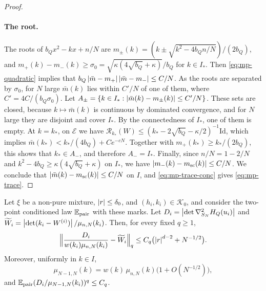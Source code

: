 \begin{proof}
\paragraph{The root.}
The roots of $b_Qx^2-kx+n/N$ are $m_\pm(k)=(k\pm\sqrt{k^2-4b_Qn/N})/(2b_Q)$, and $m_+(k)-m_-(k)\ge\sigma_0=\sqrt{\kappa(4\sqrt{b_Q}+\kappa)}/b_Q$ for $k\in I_*$. Then \eqref{eq:mp-quadratic} implies that $b_Q\left|\bar m-m_+\right|\left|\bar m-m_-\right|\le C/N$. As the roots are separated by $\sigma_0$, for $N$ large $\bar m(k)$ lies within $C'/N$ of one of them, where $C'=4C/(b_Q\sigma_0)$. Let $A_\pm=\{k\in I_*:\left|\bar m(k)-m_\pm(k)\right|\le C'/N\}$. These sets are closed, because $k\mapsto\bar m(k)$ is continuous by dominated convergence, and for $N$ large they are disjoint and cover $I_*$. By the connectedness of $I_*$, one of them is empty. At $k=k_*$, on $\mathcal E$ we have $\mathcal R_{k_*}(W)\le(k_*-2\sqrt{b_Q}-\kappa/2)^{-1}\mathrm{Id}$, which implies $\bar m(k_*)<k_*/(4b_Q)+Ce^{-cN}$. Together with $m_+(k_*)\ge k_*/(2b_Q)$, this shows that $k_*\in A_-$, and therefore $A_-=I_*$. Finally, since $n/N=1-2/N$ and $k^2-4b_Q\ge\kappa(4\sqrt{b_Q}+\kappa)$ on $I_*$, we have $\left|m_-(k)-m_{\rm sc}(k)\right|\le C/N$. We conclude that $\left|\bar m(k)-m_{\rm sc}(k)\right|\le C/N$ on $I$, and \eqref{eq:mp-trace-conc} gives \eqref{eq:mp-trace}.
\end{proof}

\begin{lemma}\label{lem:mp-schur}
Let $\xi$ be a non-pure mixture, $\left|r\right|\le\delta_0$, and $(h_i,k_i)\in\mathcal K_0$, and consider the two-point conditioned law $\mathbb E_{\mathrm{pair}}$ with these marks. Let $D_i=\left|\det\nabla^2_{S_N}H_Q(u_i)\right|$ and $\widetilde W_i=\left|\det(k_i-W^{(i)})\right|/\mu_{n,N}(k_i)$. Then, for every fixed $q\ge1$,
\begin{equation}\label{eq:mp-schur}
\Bigl\|\frac{D_i}{w(k_i)\mu_{n,N}(k_i)}-\widetilde W_i\Bigr\|_q\le C_q\bigl(\left|r\right|^{d-2}+N^{-1/2}\bigr).
\end{equation}
Moreover, uniformly in $k\in I$,
\begin{equation}\label{eq:mp-one-point-schur}
\mu_{N-1,N}(k)=w(k)\,\mu_{n,N}(k)\bigl(1+O(N^{-1/2})\bigr),
\end{equation}
and $\mathbb E_{\mathrm{pair}}(D_i/\mu_{N-1,N}(k_i))^q\le C_q$.
\end{lemma}

